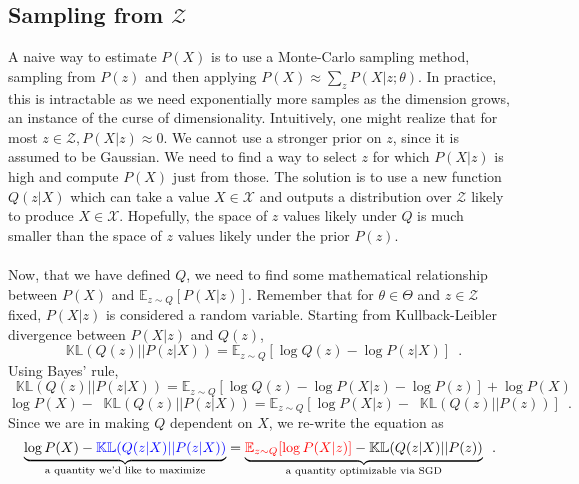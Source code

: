 \documentclass[12pt]{article}
\newcommand*\KL{\mathop{}\!\mathbb{KL}}
\begin{document}
\subsection{Sampling from $\mathcal{Z}$}
%
A naive way to estimate $P(X)$ is to use a Monte-Carlo sampling method, sampling from $P(z)$ and then applying $P(X) \approx \sum_z P(X \vert z; \theta)$.
In practice, this is intractable as we need exponentially more samples as the dimension grows, an instance of the curse of dimensionality.
Intuitively, one might realize that for most $z \in \mathcal{Z}, P(X \lvert z) \approx 0$.
We cannot use a stronger prior on $z$, since it is assumed to be Gaussian.
We need to find a way to select $z$ for which $P(X \lvert z)$ is high and compute $P(X)$ just from those.
The solution is to use a new function $Q(z \lvert X)$ which can take a value $X \in \mathcal{X}$ and outputs a distribution over $\mathcal{Z}$ likely to produce $X \in \mathcal{X}$.
Hopefully, the space of $z$ values likely under $Q$ is much smaller than the space of $z$ values likely under the prior $P(z)$.
\\
\\
Now, that we have defined $Q$, we need to find some mathematical relationship between $P(X)$ and $\mathbb{E}_{z \sim Q}[P(X \vert z)]$.
Remember that for $\theta \in \Theta$ and $z \in \mathcal{Z}$ fixed, $P(X \lvert z)$ is considered a random variable.
Starting from Kullback-Leibler divergence between $P(X \lvert z)$ and $Q(z)$,
%
\begin{equation}
    \KL(Q(z) \lvert\lvert P(z \lvert X)) =
    \mathbb{E}_{z \sim Q}[
        \log Q(z) - \log P(z \lvert X)
    ]
    \enspace .
\end{equation}
%
Using Bayes' rule,
%
\begin{equation}
    \KL(Q(z) \lvert\lvert P(z \lvert X)) =
    \mathbb{E}_{z \sim Q}[
        \log Q(z) - \log P(X \lvert z) - \log P(z)
    ] + \log P(X)
\end{equation}
%
\begin{equation}
    \log P(X) - \KL(Q(z) \vert\vert P(z \vert X)) =
    \mathbb{E}_{z \sim Q}[
        \log P(X \vert z)
        - \KL(Q(z) \vert\vert P(z))
    ]
    \enspace .
\end{equation}
%
Since we are in making $Q$ dependent on $X$, we re-write the equation as
%
\begin{equation}
    \label{eq:vae}
    \underbrace{\log P(X) - \textcolor{blue}{\KL(Q(z \vert X) \vert\vert P(z \vert X))}}_\textrm{a quantity we'd like to maximize} =
    \underbrace{\textcolor{red}{\mathbb{E}_{z \sim Q}[
        \log P(X \vert z)
    ]}
    - \KL(Q(z \vert X) \vert\vert P(z))}_\textrm{a quantity optimizable via SGD}
    \enspace .
\end{equation}
\end{document}
